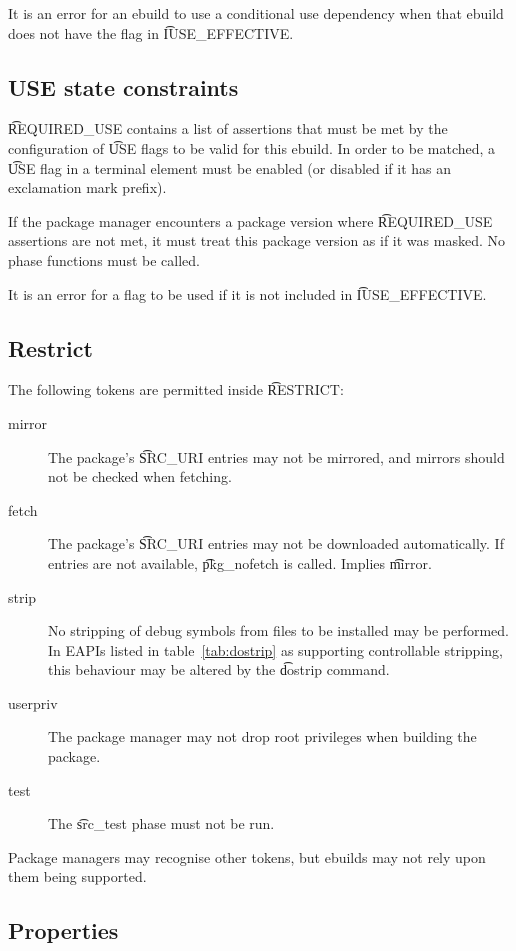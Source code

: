 It is an error for an ebuild to use a conditional use dependency when that ebuild does not have the
flag in \t{IUSE_EFFECTIVE}.

\subsection{USE state constraints}
\label{sec:required-use}
\t{REQUIRED_USE} contains a list of assertions that must be met by the configuration of \t{USE}
flags to be valid for this ebuild. In order to be matched, a \t{USE} flag in a terminal element
must be enabled (or disabled if it has an exclamation mark prefix).

If the package manager encounters a package version where \t{REQUIRED_USE} assertions are not met,
it must treat this package version as if it was masked. No phase functions must be called.

It is an error for a flag to be used if it is not included in \t{IUSE_EFFECTIVE}.

\subsection{Restrict}
\label{sec:restrict}

The following tokens are permitted inside \t{RESTRICT}:

\begin{description}
\item[mirror] The package's \t{SRC_URI} entries may not be mirrored, and mirrors should not
    be checked when fetching.
\item[fetch] The package's \t{SRC_URI} entries may not be downloaded automatically. If
    entries are not available, \t{pkg_nofetch} is called. Implies \t{mirror}.
\item[strip] No stripping of debug symbols from files to be installed may be performed. In EAPIs
    listed in table~\ref{tab:dostrip} as supporting controllable stripping, this behaviour may be
    altered by the \t{dostrip} command.
\item[userpriv] The package manager may not drop root privileges when building the package.
\item[test] The \t{src_test} phase must not be run.
\end{description}

Package managers may recognise other tokens, but ebuilds may not rely upon them being supported.

\subsection{Properties}
\label{sec:properties}

